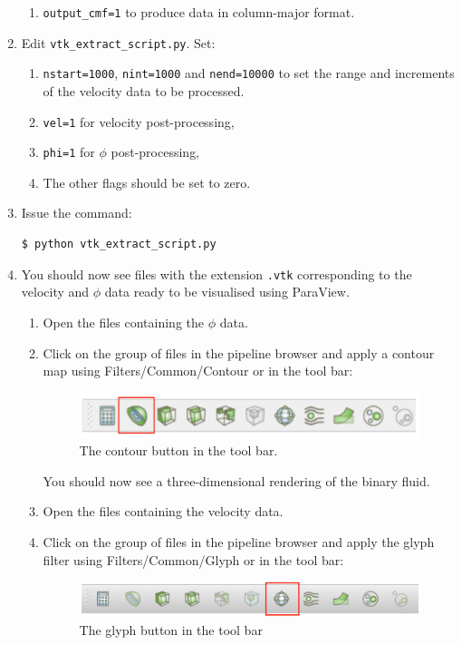 \documentclass[11pt,twoside,a4paper]{article}
\begin{document}
\begin{enumerate}
\begin{enumerate}
\item \texttt{output\_cmf=1} to produce data in column-major format.
\end{enumerate}
\item Edit \texttt{vtk\_extract\_script.py}. Set:
\begin{enumerate}
\item \texttt{nstart=1000}, \texttt{nint=1000} and \texttt{nend=10000} to set the range and 
increments of the velocity data
to be processed.
\item \texttt{vel=1} for velocity post-processing, 
\item \texttt{phi=1} for $\phi$ post-processing,
\item The other flags should be set to zero. 
\end{enumerate}
\item Issue the command:
\begin{lstlisting}
$ python vtk_extract_script.py
\end{lstlisting}
\item You should now see files with the extension \texttt{.vtk} corresponding to the velocity 
and $\phi$ data ready to be visualised using ParaView.
\begin{enumerate}
\item Open the files containing the $\phi$ data.
\item Click on the group of files in the pipeline browser and apply a contour map using 
Filters/Common/Contour or in the tool bar: 

\begin{figure}[H]
\begin{center}
\includegraphics[width=0.8\linewidth]{contour.png}
  \caption{The contour button in the tool bar.}
  \label{fig:contour}
  \end{center}
\end{figure}

You should now see a three-dimensional rendering of the binary fluid.
\item Open the files containing the velocity data.
\item Click on the group of files in the pipeline browser and apply the glyph filter using 
Filters/Common/Glyph or in the tool bar: 

\begin{figure}[H]
\begin{center}
\includegraphics[width=0.8\linewidth]{glyph.png}
  \caption{The glyph button in the tool bar}
  \label{fig:glyph}
  \end{center}
\end{figure}


\end{enumerate}
\end{enumerate}
\end{document}
